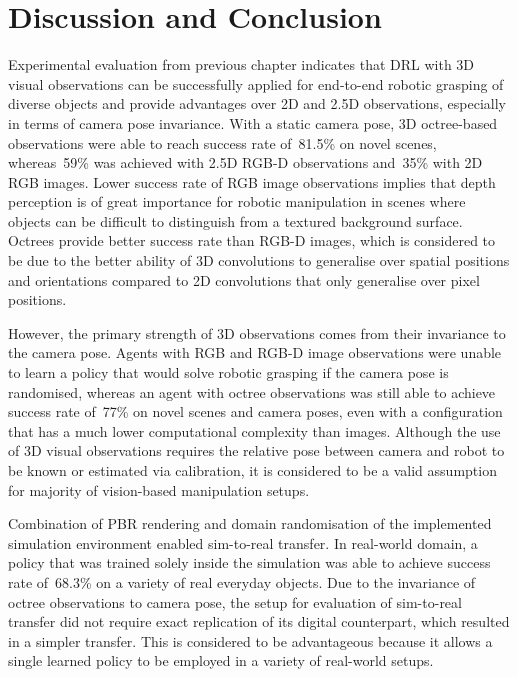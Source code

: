 \chapter{Discussion and Conclusion}\label{ch:discussion_and_conclusion}

Experimental evaluation from previous chapter indicates that DRL with 3D visual observations can be successfully applied for end-to-end robotic grasping of diverse objects and provide advantages over 2D and 2.5D observations, especially in terms of camera pose invariance. With a static camera pose, 3D octree-based observations were able to reach success rate of~81.5\% on novel scenes, whereas~59\% was achieved with 2.5D RGB-D observations and~35\% with 2D RGB images. Lower success rate of RGB image observations implies that depth perception is of great importance for robotic manipulation in scenes where objects can be difficult to distinguish from a textured background surface. Octrees provide better success rate than RGB-D images, which is considered to be due to the better ability of 3D convolutions to generalise over spatial positions and orientations compared to 2D convolutions that only generalise over pixel positions.

However, the primary strength of 3D observations comes from their invariance to the camera pose. Agents with RGB and RGB-D image observations were unable to learn a policy that would solve robotic grasping if the camera pose is randomised, whereas an agent with octree observations was still able to achieve success rate of~77\% on novel scenes and camera poses, even with a configuration that has a much lower computational complexity than images. Although the use of 3D visual observations requires the relative pose between camera and robot to be known or estimated via calibration, it is considered to be a valid assumption for majority of vision-based manipulation setups.

Combination of PBR rendering and domain randomisation of the implemented simulation environment enabled sim-to-real transfer. In real-world domain, a policy that was trained solely inside the simulation was able to achieve success rate of~68.3\% on a variety of real everyday objects. Due to the invariance of octree observations to camera pose, the setup for evaluation of sim-to-real transfer did not require exact replication of its digital counterpart, which resulted in a simpler transfer. This is considered to be advantageous because it allows a single learned policy to be employed in a variety of real-world setups.


